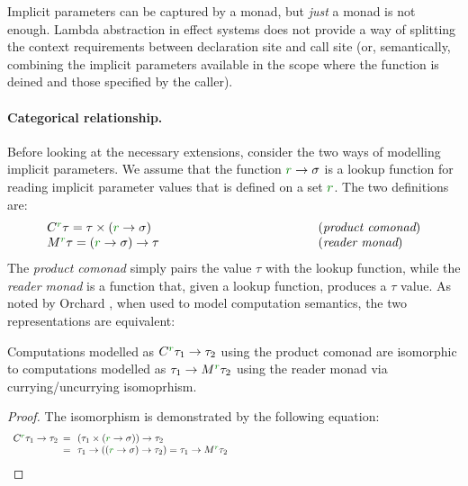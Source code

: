 Implicit parameters can be captured by a monad, but \emph{just} a monad is not enough.
Lambda abstraction in effect systems does not provide a way of splitting the context
requirements between declaration site and call site (or, semantically, combining the implicit 
parameters available in the scope where the function is deined and those specified by the caller).

\paragraph{Categorical relationship.}
Before looking at the necessary extensions, consider the two ways of modelling implicit 
parameters. We assume that the function $\cclrd{r} \rightarrow \sigma$ is a lookup function
for reading implicit parameter values that is defined on a set $\cclrd{r}$. The two definitions
are:
%
\begin{equation*}
\begin{array}{lll}
 \ctyp{\cclrd{r}}\tau = \tau \times (\cclrd{r} \rightarrow \sigma) &~\hspace{10em}~& (\emph{product comonad}) \\
 \mtyp{\cclrd{r}}\tau = (\cclrd{r} \rightarrow \sigma) \rightarrow \tau && (\emph{reader monad})
\end{array} 
\end{equation*}
%
The \emph{product comonad} simply pairs the value $\tau$ with the lookup function, while
the \emph{reader monad} is a function that, given a lookup function, produces a $\tau$ value.
As noted by Orchard \cite{comonads-vs-monads}, when used to model computation semantics, the 
two representations are equivalent:
%
\begin{remark}
Computations modelled as $\ctyp{\cclrd{r}}{\tau_1}\rightarrow\tau_2$ using the product comonad
are isomorphic to computations modelled as $\tau_1\rightarrow\mtyp{\cclrd{r}}{\tau_2}$ using the
reader monad via currying/uncurrying isomoprhism.
\end{remark}
\begin{proof}
The isomorphism is demonstrated by the following equation:
\begin{equation*}
\begin{array}{lll}
 \ctyp{\cclrd{r}}{\tau_1} \rightarrow \tau_2 &\narrow{=}&
 (\tau_1 \times (\cclrd{r} \rightarrow \sigma)) \rightarrow \tau_2 \\
 &\narrow{=}& \tau_1 \rightarrow ((\cclrd{r} \rightarrow \sigma) \rightarrow \tau_2) =
 \tau_1 \rightarrow \mtyp{\cclrd{r}}{\tau_2} \hspace{23em}\qedhere \\
\end{array}
\end{equation*}
\end{proof}

